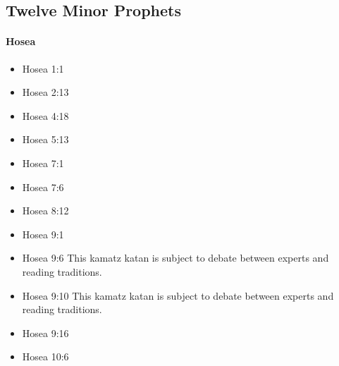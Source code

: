 \documentclass[14pt]{article}
\begin{document}
												\subsection{Twelve Minor Prophets}
												
												\paragraph{Hosea}
												
											\begin{multicols}{2}\begin{itemize}
														
														\item Hosea 1:1
														
														\item Hosea 2:13
														
														\item Hosea 4:18
														
														\item Hosea 5:13
														
														\item Hosea 7:1
														
														\item Hosea 7:6
														
														\item Hosea 8:12
																
																\item Hosea 9:1
																
																\item Hosea 9:6 This kamatz katan is subject to debate between experts and reading traditions.
																
																\item Hosea 9:10 This kamatz katan is subject to debate between experts and reading traditions.
																
																\item Hosea 9:16
																
																\item Hosea 10:6
																

\end{itemize}
\end{multicols}
\end{document}
